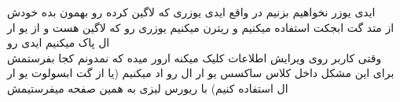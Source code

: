 \documentclass{article}
\begin{document}
		
		
		 ایدی یوزر نخواهیم بزنیم در واقع ایدی یوزری که لاگین کرده رو بهمون بده خودش \\
		از متد گت ابجکت استفاده میکنیم و ریترن میکنیم یوزری رو که لاگین هست و از یو ار ال پاک میکنیم ایدی رو\\
		
		 وقتی کاربر روی ویرایش اطلاعات کلیک میکنه ارور میده که نمدونم کجا بفرستمش برای این مشکل داخل کلاس ساکسس یو ار ال
		رو اد میکنیم (یا از گت ابسولوت یو ار ال استفاده کنیم) با ریورس لیزی به همین صفحه میفرستیمش
\end{document}
